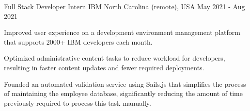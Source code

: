 

\begin{cventries}

  \cventry
    {Full Stack Developer Intern} %
    {IBM} %
    {North Carolina (remote), USA} %
    {May 2021 - Aug 2021} %
    {
      \begin{cvitems} %
        \item {Improved user experience on a development environment management platform that supports 2000+ IBM developers each month.}
        \item {Optimized administrative content tasks to reduce workload for developers, resulting in faster content updates and fewer required deployments.}
        \item {Founded an automated validation service using Sails.js that simplifies the process of maintaining the employee database, significantly reducing the amount of time previously required to process this task manually.}
      \end{cvitems}
    }


\end{cventries}
